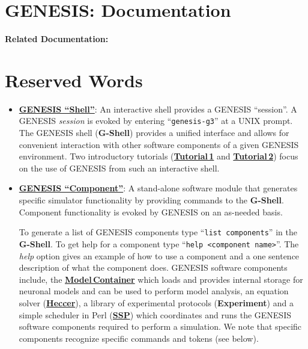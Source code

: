 \documentclass[12pt]{article}
\begin{document}
\section*{GENESIS: Documentation}

{\bf Related Documentation:}

\section*{Reserved Words}

\begin{itemize}

\item \href{../gshell/gshell.tex}{\bf GENESIS ``Shell''}: An interactive shell provides a GENESIS ``session''. A GENESIS  {\it session} is evoked by entering ``{\tt genesis-g3}'' at a UNIX prompt. The GENESIS shell ({\bf G-Shell}) provides a unified interface and allows for convenient interaction with other software components of a given GENESIS environment.  Two introductory tutorials (\href{../tutorial1/tutorial1.tex}{\bf Tutorial\,1} and \href{../tutorial2/tutorial2.tex}{\bf Tutorial\,2}) focus on the use of GENESIS from such an interactive shell.

\item \href{../genesis-components/genesis-components.tex}{\bf GENESIS ``Component''}:  A stand-alone software module that generates specific simulator functionality by providing commands to the {\bf G-Shell}. Component functionality is evoked by GENESIS on an as-needed basis.

To generate a list of GENESIS components type ``{\tt list components}'' in the {\bf G-Shell}. To get help for a component type ``{\tt help <component name>}''. The {\it help} option gives an example of how to use a component and a one sentence description of what the component does. GENESIS software components include, the \href{../model-container/model-container.tex}{\bf Model\,Container} which loads and provides internal storage for neuronal models and can be used to perform model analysis, an equation solver (\href{../heccer/heccer.tex}{\bf Heccer}), a library of experimental protocols ({\bf Experiment}) and a simple scheduler in Perl (\href{../ssp/ssp.tex}{\bf SSP}) which coordinates and runs the GENESIS software components required to perform a simulation. We note that specific components recognize specific commands and tokens (see below).


\end{itemize}
\end{document}
